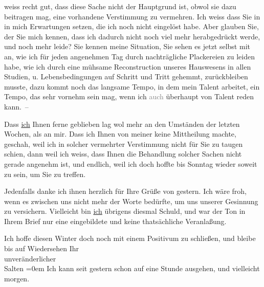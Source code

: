                weiss recht gut, dass diese Sache nicht der Hauptgrund ist, obwol sie dazu beitragen
               mag, eine vorhandene Verstimmung zu vermehren. Ich weiss dass Sie in \label{K_L03132-4v}\label{K_L03132-4} in mich Erwartungen setzen, die ich noch nicht eingelöst habe. Aber glauben
               Sie, der Sie mich kennen, dass ich dadurch nicht noch viel mehr herabgedrückt werde,
               und noch mehr leide? Sie kennen meine Situation, Sie sehen es jetzt selbst mit an,
               wie ich für jeden ange{\pb}nehmen Tag durch nachträgliche Plackereien zu leiden habe, wie ich durch eine
               mühsame Reconstruction unseres Hauswesens in allen Studien, u. Lebensbedingungen auf
               Schritt und Tritt gehemmt, zurückbleiben musste, dazu kommt noch das langsame Tempo,
               in dem mein Talent arbeitet, ein Tempo, das sehr
               vornehm sein mag, wenn ich \introOben{}\textcolor{gray}{auch}\introOben{} überhaupt von Talent reden kann. –\pend
           
\pstart
           Dass \uline{ich} Ihnen ferne geblieben
               lag wol mehr an den Umständen der letzten Wochen, als an mir. Dass ich Ihnen von
               meiner \label{K_L03132-5v}\label{K_L03132-5} keine Mittheilung
               machte, geschah, weil ich in solcher vermehrter {\pb}Verstimmung nicht für Sie zu
               taugen schien, dann weil ich weiss, dass Ihnen die Behandlung solcher Sachen nicht
               gerade angenehm ist, und endlich, weil ich doch hoffte bis Sonntag wieder soweit zu sein, um Sie zu treffen.\pend
           
\pstart
           Jedenfalls danke ich ihnen herzlich für Ihre Grüße von gestern. Ich wäre froh, wenn es zwischen uns nicht mehr der Worte
               bedürfte, um uns unserer Gesinnung zu versichern.
               Vielleicht bin \uline{ich} übrigens diesmal Schuld, und war
               der Ton in Ihrem Brief nur eine eingebildete
               und keine thatsächliche Veranlaßung.\pend
           
\pstart
           Ich hoffe diesen Winter doch noch mit einem Positivum zu schließen, und bleibe
               bis auf Wiedersehen Ihr {\\[\baselineskip]}unveränderlicher {\\[\baselineskip]}\spacefill\mbox{Salten}\pend
           \leftskip=0em{}
\pstart
           \noindent{}Ich kann seit gestern schon auf eine Stunde
                  ausgehen, und \label{K_L03132-6v}\label{K_L03132-6} vielleicht morgen.\pend
           \endnumbering{}  
      